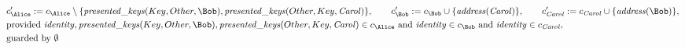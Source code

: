 \begin{align*}
&
c'_
{
\Alice
}
 := 
c_
{
\Alice
}
 \setminus 
\{
\mathit{\detokenize{
presented_keys
}}
(
Key
,
Other
,
\Bob
)
,
\mathit{\detokenize{
presented_keys
}}
(
Other
,
Key
,
\mathit{Carol}
)
\}
, \qquad 
c'_
{
\Bob
}
 := 
c_
{
\Bob
}
 \cup 
\{
\mathit{\detokenize{
address
}}
(
\mathit{Carol}
)
\}
, \qquad 
c'_
{
\mathit{Carol}
}
 := 
c_
{
\mathit{Carol}
}
 \cup 
\{
\mathit{\detokenize{
address
}}
(
\Bob
)
\}
,\\
&
\text{provided } 
\mathit{\detokenize{
identity
}}
,
\mathit{\detokenize{
presented_keys
}}
(
Key
,
Other
,
\Bob
)
,
\mathit{\detokenize{
presented_keys
}}
(
Other
,
Key
,
\mathit{Carol}
)
 \in c_
{
\Alice
}
 \text{ and } 
\mathit{\detokenize{
identity
}}
 \in c_
{
\Bob
}
 \text{ and } 
\mathit{\detokenize{
identity
}}
 \in c_
{
\mathit{Carol}
}
,\\
&
\text{guarded by } \emptyset
\end{align*}
